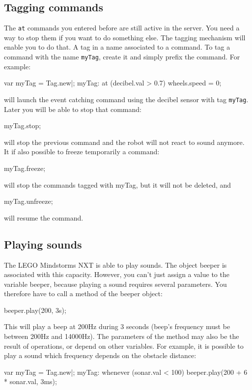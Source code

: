 \subsection{Tagging commands}
The \lstinline{at} commands you entered before are still active in the
server. You need a way to stop them if you want to do something else. The
tagging mechanism will enable you to do that.  A tag in a name associated to
a command. To tag a command with the name \lstinline{myTag}, create it and
simply prefix the command. For example:
\begin{urbiunchecked}
var myTag = Tag.new|;
myTag: at (decibel.val > 0.7)
  wheels.speed = 0;
\end{urbiunchecked}
\noindent
will launch the event catching command using the decibel sensor with tag
\lstinline{myTag}.  Later you will be able to stop that command:
\begin{urbiunchecked}
myTag.stop;
\end{urbiunchecked}
\noindent
will stop the previous command and the robot will not react to sound anymore.
It if also possible to freeze temporarily a command:
\begin{urbiunchecked}
myTag.freeze;
\end{urbiunchecked}
\noindent
will stop the commands tagged with myTag, but it will not be deleted, and
\begin{urbiunchecked}
myTag.unfreeze;
\end{urbiunchecked}
\noindent
will resume the command.

\subsection{Playing sounds}
\label{sec:nxt:sounds}
The LEGO Mindstorms NXT is able to play sounds. The object beeper is associated
with this capacity. However, you can't just assign a value to the variable
beeper, because playing a sound requires several parameters. You therefore have
to call a method of the beeper object:
\begin{urbiunchecked}
beeper.play(200, 3s);
\end{urbiunchecked}

This will play a beep at 200Hz during 3 seconds (beep's frequency must be
between 200Hz and 14000Hz).  The parameters of the method may also be the
result of operations, or depend on other variables. For example, it is
possible to play a sound which frequency depends on the obstacle distance:
\begin{urbiunchecked}
var myTag = Tag.new|;
myTag: whenever (sonar.val < 100)
  beeper.play(200 + 6 * sonar.val, 3ms);
\end{urbiunchecked}

